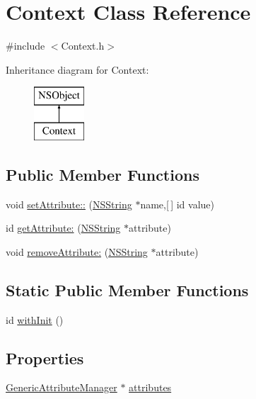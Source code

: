 \hypertarget{interface_context}{
\section{\-Context \-Class \-Reference}
\label{interface_context}
}


{\ttfamily \#include $<$\-Context.\-h$>$}

\-Inheritance diagram for \-Context\-:\begin{figure}[H]
\begin{center}
\leavevmode
\includegraphics[height=2.000000cm]{interface_context}
\end{center}
\end{figure}
\subsection*{\-Public \-Member \-Functions}
\begin{DoxyCompactItemize}
\item 
void \hyperlink{interface_context_a4b1c1a4b57ff349ec70247084261fad0}{set\-Attribute\-::} (\hyperlink{class_n_s_string}{\-N\-S\-String} $\ast$name,\mbox{[}$\,$\mbox{]} id value)
\item 
id \hyperlink{interface_context_a59e340be3fd52fd67e388a2b5f4587cb}{get\-Attribute\-:} (\hyperlink{class_n_s_string}{\-N\-S\-String} $\ast$attribute)
\item 
void \hyperlink{interface_context_a563b46be6755272bf93782b989712f41}{remove\-Attribute\-:} (\hyperlink{class_n_s_string}{\-N\-S\-String} $\ast$attribute)
\end{DoxyCompactItemize}
\subsection*{\-Static \-Public \-Member \-Functions}
\begin{DoxyCompactItemize}
\item 
id \hyperlink{interface_context_a05071f2135b2f53b61ace92f1d316a7c}{with\-Init} ()
\end{DoxyCompactItemize}
\subsection*{\-Properties}
\begin{DoxyCompactItemize}
\item 
\hyperlink{interface_generic_attribute_manager}{\-Generic\-Attribute\-Manager} $\ast$ \hyperlink{interface_context_ac4eab80500f59a05e42abea7b64d41af}{attributes}
\end{DoxyCompactItemize}


